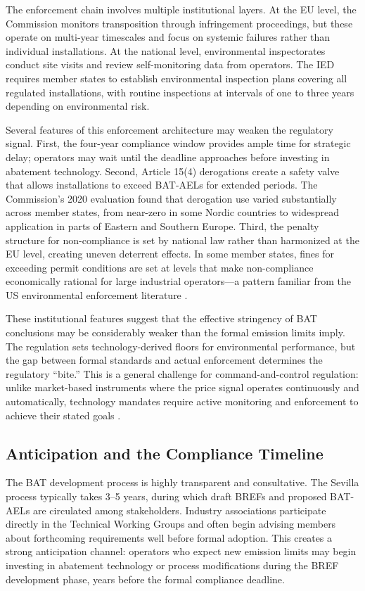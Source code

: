\documentclass[12pt]{article}
\begin{document}
The enforcement chain involves multiple institutional layers. At the EU level, the Commission monitors transposition through infringement proceedings, but these operate on multi-year timescales and focus on systemic failures rather than individual installations. At the national level, environmental inspectorates conduct site visits and review self-monitoring data from operators. The IED requires member states to establish environmental inspection plans covering all regulated installations, with routine inspections at intervals of one to three years depending on environmental risk.

Several features of this enforcement architecture may weaken the regulatory signal. First, the four-year compliance window provides ample time for strategic delay; operators may wait until the deadline approaches before investing in abatement technology. Second, Article 15(4) derogations create a safety valve that allows installations to exceed BAT-AELs for extended periods. The Commission's 2020 evaluation found that derogation use varied substantially across member states, from near-zero in some Nordic countries to widespread application in parts of Eastern and Southern Europe. Third, the penalty structure for non-compliance is set by national law rather than harmonized at the EU level, creating uneven deterrent effects. In some member states, fines for exceeding permit conditions are set at levels that make non-compliance economically rational for large industrial operators---a pattern familiar from the US environmental enforcement literature \citep{duflo2013}.

These institutional features suggest that the effective stringency of BAT conclusions may be considerably weaker than the formal emission limits imply. The regulation sets technology-derived floors for environmental performance, but the gap between formal standards and actual enforcement determines the regulatory ``bite.'' This is a general challenge for command-and-control regulation: unlike market-based instruments where the price signal operates continuously and automatically, technology mandates require active monitoring and enforcement to achieve their stated goals \citep{hepburn2006}.

\subsection{Anticipation and the Compliance Timeline}

The BAT development process is highly transparent and consultative. The Sevilla process typically takes 3--5 years, during which draft BREFs and proposed BAT-AELs are circulated among stakeholders. Industry associations participate directly in the Technical Working Groups and often begin advising members about forthcoming requirements well before formal adoption. This creates a strong anticipation channel: operators who expect new emission limits may begin investing in abatement technology or process modifications during the BREF development phase, years before the formal compliance deadline.
\end{document}
